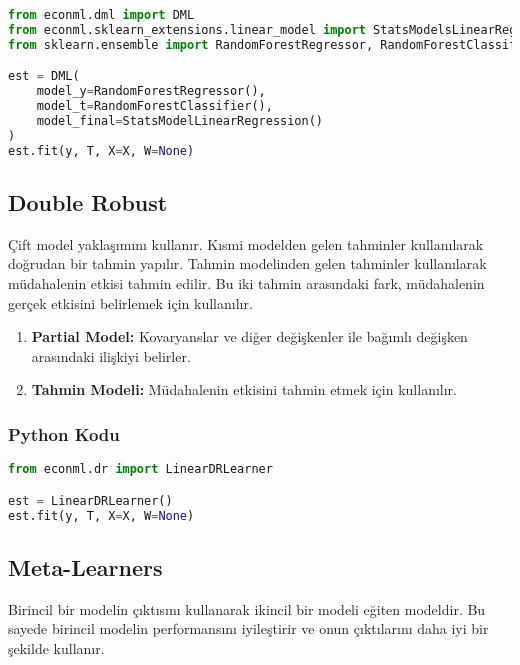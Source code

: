\begin{lstlisting}[language=Python, caption=ecoml'de DML örneği.]
from econml.dml import DML
from econml.sklearn_extensions.linear_model import StatsModelsLinearRegression
from sklearn.ensemble import RandomForestRegressor, RandomForestClassifier

est = DML(
	model_y=RandomForestRegressor(),
	model_t=RandomForestClassifier(),
	model_final=StatsModelLinearRegression()
)
est.fit(y, T, X=X, W=None)
\end{lstlisting}

\newpage

\subsection{Double Robust}
Çift model yaklaşımını kullanır. Kısmi modelden gelen tahminler kullanılarak doğrudan bir tahmin yapılır. Tahmin modelinden gelen tahminler kullanılarak müdahalenin etkisi tahmin edilir. Bu iki tahmin arasındaki fark, müdahalenin gerçek etkisini belirlemek için kullanılır.

\begin{enumerate}
    \item \textbf{Partial Model:} Kovaryanslar ve diğer değişkenler ile bağımlı değişken arasındaki ilişkiyi belirler.
    \item \textbf{Tahmin Modeli:} Müdahalenin etkisini tahmin etmek için kullanılır.
\end{enumerate}

\subsubsection{Python Kodu}

\begin{lstlisting}[language=Python, caption=econml'de Double Robust örneği.]
from econml.dr import LinearDRLearner

est = LinearDRLearner()
est.fit(y, T, X=X, W=None)
\end{lstlisting}

\newpage

\subsection{Meta-Learners}
Birincil bir modelin çıktısını kullanarak ikincil bir modeli eğiten modeldir. Bu sayede birincil modelin performansını iyileştirir ve onun çıktılarını daha iyi bir şekilde kullanır.

